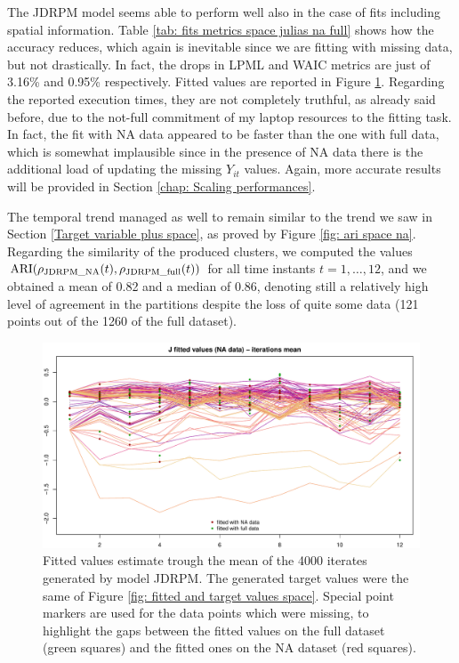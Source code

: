 \documentclass[12pt,	%
	a4paper,		%
	twoside,		%
	openright,		%
	titlepage,%
	]{book}
\theoremstyle{definition}
\begin{document}
The JDRPM model seems able to perform well also in the case of fits including spatial information. Table \ref{tab: fits metrics space julias na full} shows how the accuracy reduces, which again is inevitable since we are fitting with missing data, but not drastically. In fact, the drops in LPML and WAIC metrics are just of 3.16\% and 0.95\% respectively. Fitted values are reported in Figure \ref{fig: target values estimates space NA}. Regarding the reported execution times, they are not completely truthful, as already said before, due to the not-full commitment of my laptop resources to the fitting task. In fact, the fit with NA data appeared to be faster than the one with full data, which is somewhat implausible since in the presence of NA data there is the additional load of updating the missing $Y_{it}$ values. Again, more accurate results will be provided in Section \ref{chap: Scaling performances}.

The temporal trend managed as well to remain similar to the trend we saw in Section \ref{Target variable plus space}, as proved by Figure \ref{fig: ari space na}. Regarding the similarity of the produced clusters, we computed the values $\operatorname{ARI}(\rho_{\text{JDRPM\_NA}}(t),\rho_{\text{JDRPM\_full}}(t))$ for all time instants $t=1,\ldots,12$, and we obtained a mean of 0.82 and a median of 0.86, denoting still a relatively high level of agreement in the partitions despite the loss of quite some data (121 points out of the 1260 of the full dataset).

\begin{figure}[!ht]
    \centering
    \includegraphics[width=1\linewidth]{Testing/NA data/space/J_mean_prediction.pdf}
    \caption[Fitted values of JDRPM fit, target plus space values, NA dataset]{Fitted values estimate trough the mean of the 4000 iterates generated by model JDRPM. The generated target values were the same of Figure \ref{fig: fitted and target values space}. Special point markers are used for the data points which were missing, to highlight the gaps between the fitted values on the full dataset (green squares) and the fitted ones on the NA dataset (red squares).}
    \label{fig: target values estimates space NA}
\end{figure}
\end{document}
